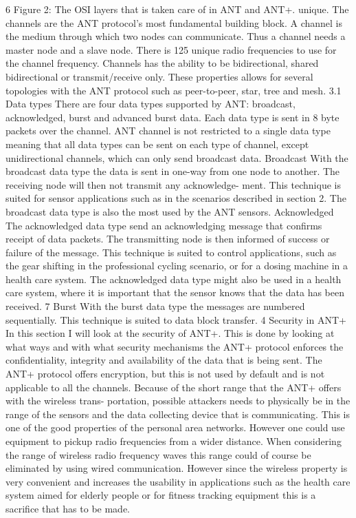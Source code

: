 6
 Figure 2: The OSI layers that is taken care of in ANT and ANT+.
unique. The channels are the ANT protocol’s most fundamental building block. A channel is the medium through which two nodes can communicate. Thus a channel needs a master node and a slave node. There is 125 unique radio frequencies to use for the channel frequency. Channels has the ability to be bidirectional, shared bidirectional or transmit/receive only. These properties allows for several topologies with the ANT protocol such as peer-to-peer, star, tree and mesh.
3.1 Data types
There are four data types supported by ANT: broadcast, acknowledged, burst and advanced burst data. Each data type is sent in 8 byte packets over the channel. ANT channel is not restricted to a single data type meaning that all data types can be sent on each type of channel, except unidirectional channels, which can only send broadcast data.
Broadcast With the broadcast data type the data is sent in one-way from one node to another. The receiving node will then not transmit any acknowledge- ment. This technique is suited for sensor applications such as in the scenarios described in section 2. The broadcast data type is also the most used by the ANT sensors.
Acknowledged The acknowledged data type send an acknowledging message that confirms receipt of data packets. The transmitting node is then informed of success or failure of the message. This technique is suited to control applications, such as the gear shifting in the professional cycling scenario, or for a dosing machine in a health care system. The acknowledged data type might also be used in a health care system, where it is important that the sensor knows that the data has been received.
7
Burst With the burst data type the messages are numbered sequentially. This technique is suited to data block transfer.
4 Security in ANT+
In this section I will look at the security of ANT+. This is done by looking at what ways and with what security mechanisms the ANT+ protocol enforces the confidentiality, integrity and availability of the data that is being sent. The ANT+ protocol offers encryption, but this is not used by default and is not applicable to all the channels.
Because of the short range that the ANT+ offers with the wireless trans- portation, possible attackers needs to physically be in the range of the sensors and the data collecting device that is communicating. This is one of the good properties of the personal area networks. However one could use equipment to pickup radio frequencies from a wider distance. When considering the range of wireless radio frequency waves this range could of course be eliminated by using wired communication. However since the wireless property is very convenient and increases the usability in applications such as the health care system aimed for elderly people or for fitness tracking equipment this is a sacrifice that has to be made.
